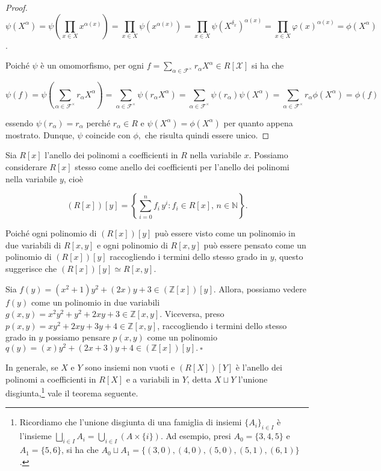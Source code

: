 \begin{proof}
	\[ \psi(X^\alpha) = 
	\psi\left( \prod\limits_{x \in X} x^{\alpha(x)} \right) = 
	\prod\limits_{x \in X} \psi\left(x^{\alpha(x)} \right) = 
	\prod\limits_{x \in X} \psi(X^{\delta_x})^{\alpha(x)} = 
	\prod\limits_{x \in X} \varphi(x)^{\alpha(x)} = 
	\phi(X^\alpha) \]. 
	
	Poiché $\psi$ è un omomorfismo, per ogni $f = \sum\limits_{\alpha \in \mathcal{F}^\times} r_\alpha X^\alpha \in R[\mathcal{X}]$ si ha che 
	
	\[ \psi(f) = 
	\psi\left(\sum\limits_{\alpha \in \mathcal{F}^\times} r_\alpha X^\alpha \right) = 
	\sum\limits_{\alpha \in \mathcal{F}^\times} \psi(r_\alpha X^\alpha) = 
	\sum\limits_{\alpha \in \mathcal{F}^\times} \psi(r_\alpha) \psi(X^\alpha) = 
	\sum\limits_{\alpha \in \mathcal{F}^\times} r_\alpha \phi(X^\alpha) = 
	\phi(f)\] 
	
	essendo $\psi(r_\alpha) = r_\alpha$ perché $r_\alpha \in R$ e $\psi(X^\alpha) = \phi(X^\alpha)$ per quanto appena mostrato. 
	Dunque, $\psi$ coincide con $\phi,$ che risulta quindi essere unico.
\end{proof}

\noindent Sia $R[x]$ l'anello dei polinomi a coefficienti in $R$ nella variabile $x.$ 
Possiamo considerare $R[x]$ stesso come anello dei coefficienti per l'anello dei polinomi nella variabile $y$, cioè 

\[(R[x])[y]=\left\{\sum\limits_{i=0}^n f_i\,y^i : f_i\in R[x],\, n\in \mathbb{N}\right\}.\] 

Poiché ogni polinomio di $(R[x])[y]$ può essere visto come un polinomio in due variabili di $R[x,y]$ e ogni polinomio di $R[x,y]$ 
può essere pensato come un polinomio di $(R[x])[y]$ raccogliendo i termini dello stesso grado in $y$, questo suggerisce che $(R[x])[y]\simeq R[x,y]$.

\begin{exm}
  Sia $f(y)=(x^2+1)y^2+(2x)y+3 \in (\mathbb{Z}[x])[y]$. Allora, possiamo vedere $f(y)$ come un polinomio in due variabili 
  $g(x,y)=x^2y^2+y^2+2xy+3 \in \mathbb{Z}[x,y]$. Viceversa, preso $p(x,y)=xy^2+2xy+3y+4\in \mathbb{Z}[x,y]$, 
  raccogliendo i termini dello stesso grado in $y$ possiamo pensare $p(x,y)$ come un polinomio $q(y)=(x)y^2+(2x+3)y+4 \in (\mathbb{Z}[x])[y]. \ \square$
\end{exm}

\noindent In generale, se $X$ e $Y$ sono insiemi non vuoti e $(R[X])[Y]$ è l'anello dei polinomi a coefficienti in $R[X]$ e a variabili in $Y$, 
detta $X \sqcup Y$ l'unione disgiunta,\footnote{Ricordiamo che l'unione disgiunta di una famiglia di insiemi $\{A_i\}_{i\in I}$ è l'insieme 
$\bigsqcup\limits_{i\in I} A_i = \bigcup\limits_{i\in I} (A \times \{i\})$. Ad esempio, presi $A_0=\{3,4,5\}$ e $A_1=\{5,6\}$, 
si ha che $A_0 \sqcup A_1=\{(3,0), (4,0), (5,0), (5,1), (6,1)\}$.} vale il teorema seguente.

